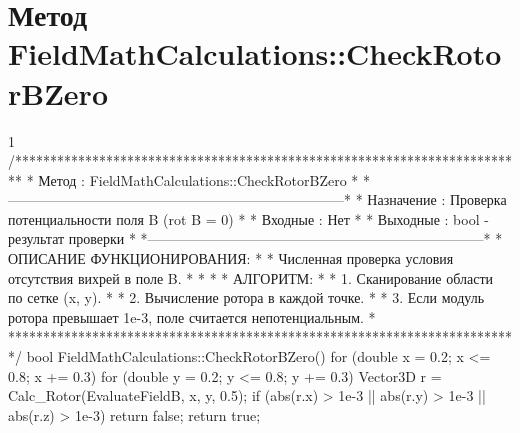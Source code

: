 \section{Метод FieldMathCalculations::CheckRotorBZero}
\footnotesize
\begin{listing}{1}
/*************************************************************************
* Метод         : FieldMathCalculations::CheckRotorBZero                 *
*------------------------------------------------------------------------*
* Назначение    : Проверка потенциальности поля B (rot B = 0)            *
* Входные       : Нет                                                    *
* Выходные      : bool - результат проверки                              *
*------------------------------------------------------------------------*
* ОПИСАНИЕ ФУНКЦИОНИРОВАНИЯ:                                             *
* Численная проверка условия отсутствия вихрей в поле B.                 *
* *
* АЛГОРИТМ:                                                              *
* 1. Сканирование области по сетке (x, y).                               *
* 2. Вычисление ротора в каждой точке.                                   *
* 3. Если модуль ротора превышает 1e-3, поле считается непотенциальным.  *
*************************************************************************/
bool FieldMathCalculations::CheckRotorBZero() {
    for (double x = 0.2; x <= 0.8; x += 0.3) {
        for (double y = 0.2; y <= 0.8; y += 0.3) {
            Vector3D r = Calc_Rotor(EvaluateFieldB, x, y, 0.5);
            if (abs(r.x) > 1e-3 || abs(r.y) > 1e-3 || abs(r.z) > 1e-3) 
                return false;
        }
    }
    return true;
}
\end{listing}
\normalsize

\pagebreak
